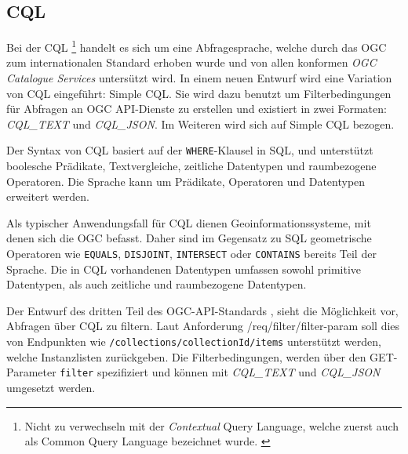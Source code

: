 \subsection{\acl{CQL}}


Bei der \acf{CQL} \footnote{Nicht zu verwechseln mit der \textit{Contextual} Query Language, welche
  zuerst auch als Common Query Language bezeichnet wurde.
  \parencite{thelibraryofcongressCQLContextual2023, ZINGGentle2003}} handelt es sich um eine
Abfragesprache, welche durch das \ac{OGC} zum internationalen Standard erhoben wurde und von allen
konformen \textit{\ac{OGC} Catalogue Services} untersützt wird.  In
einem neuen Entwurf  wird eine Variation von \ac{CQL} eingeführt: Simple
\ac{CQL}. Sie wird dazu benutzt um Filterbedingungen für Abfragen an \ac{OGC} API-Dienste zu
erstellen und existiert in zwei Formaten: \textit{CQL\_TEXT} und \textit{CQL\_JSON}.  Im
Weiteren wird sich auf Simple \ac{CQL} bezogen.

Der Syntax von \ac{CQL} basiert auf der \texttt{WHERE}-Klausel in \acs{SQL}, und unterstützt
boolesche Prädikate, Textvergleiche, zeitliche Datentypen und raumbezogene Operatoren. Die Sprache
kann um Prädikate, Operatoren und Datentypen erweitert werden.

Als typischer Anwendungsfall für \ac{CQL} dienen Geoinformationssysteme, mit denen sich die \ac{OGC}
befasst. Daher sind im Gegensatz zu \ac{SQL} geometrische Operatoren wie \texttt{EQUALS},
\texttt{DISJOINT}, \texttt{INTERSECT} oder \texttt{CONTAINS} bereits Teil der Sprache. Die in
\ac{CQL} vorhandenen Datentypen umfassen sowohl primitive Datentypen, als auch zeitliche und
raumbezogene Datentypen.

Der Entwurf des dritten Teil des OGC-API-Standards , sieht die
Möglichkeit vor, Abfragen über \ac{CQL} zu filtern. Laut Anforderung /req/filter/filter-param soll
dies von Endpunkten wie \texttt{/collections/{collectionId}/items} unterstützt werden, welche
Instanzlisten zurückgeben. Die Filterbedingungen, werden über den GET-Parameter \texttt{filter}
spezifiziert und können mit \textit{CQL\_TEXT} und \textit{CQL\_JSON} umgesetzt werden.

